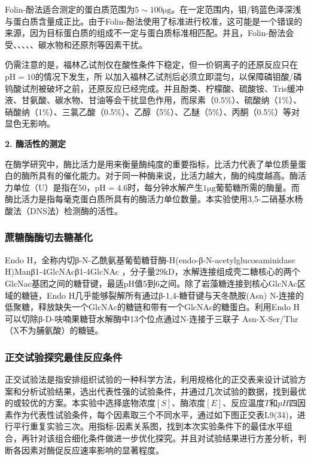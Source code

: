 Folin-酚法适合测定的蛋白质范围为$5\sim100 \mathrm{μg}$。在一定范围内，钼/钨蓝色泽深浅与蛋白质含量成正比。由于Folin-酚法使用了标准进行校准，这可能是一个错误的来源，因为目标蛋白质的组成不一定与蛋白质标准相匹配。并且，Folin-酚法会受、、、、、碳水物和还原剂等因素干扰。

仍需注意的是，福林乙试剂仅在酸性条件下稳定，但一价铜离子的还原反应只在$\mathrm{pH}=10$的情况下发生，所
以加入福林乙试剂后必须立即混匀，以保障磷钼酸/磷钨酸试剂被破坏之前，还原反应已经完成。并且酚类、柠檬酸、硫酸铵、Tris缓冲液、甘氨酸、碳水物、甘油等会干扰显色作用，而尿素（0.5\%）、硫酸纳（1\%）、硝酸纳（1\%）、三氯乙酸（0.5\%）、乙醇（5\%）、乙醚（5\%）、丙酮（0.5\%）等对显色无影响。

 \noindent \textbf {2. 酶活性的测定}
 
在酶学研究中，酶比活力是用来衡量酶纯度的重要指标，比活力代表了单位质量蛋白的酶所具有的催化能力。对于同一种酶来说，比活力越大，酶的纯度越高。酶活力单位（U）是指在50\dc，$\mathrm{pH}=4.6$时，每分钟水解产生$1\mathrm{μg}$葡萄糖所需的酶量。而酶比活力是指每毫克蛋白质所具有的酶活力单位数量。本实验使用3,5-二硝基水杨酸法（DNS法）检测酶的活性。

\subsubsection{蔗糖酶酶切去糖基化}
\par Endo H，全称内切β-N-乙酰氨基葡萄糖苷酶-H(endo-β-N-acetylglucosaminidase H)Manβ1-4GlcNAcβ1-4GlcNAc ，分子量29kD，水解连接组成壳二糖核心的两个GlcNac基团之间的糖苷键，最适pH值5到6之间。除了岩藻糖连接到核心GlcNAc区域的糖链，Endo H几乎能够裂解所有通过β-1,4-糖苷键与天冬酰胺(Asn) N-连接的低聚糖，释放缺失一个GlcNAc的糖链和带有一个GlcNAc的糖蛋白。利用Endo H可以切除β-D-呋喃果糖苷水解酶中13个位点通过N-连接于三联子 Asn-X-Ser/Thr（X不为脯氨酸）的糖链。 
\subsubsection{正交试验探究最佳反应条件}
\par 正交试验法是指安排组织试验的一种科学方法，利用规格化的正交表来设计试验方案和分析试验结果，选出代表性强的试验条件，并通过几次试验的数据，找到最优的或较优的方案。本实验中选择底物浓度$[S]$、酶浓度$[E]$、反应温度$T$和$pH$四因素作为代表性试验条件，每个因素取三个不同水平，通过如下图正交表L9(34)，进行平行重复实验三次。用指标-因素关系图，找到本次实验条件下的最佳水平组合，再针对该组合细化条件做进一步优化探究。并且对试验结果进行方差分析，判断各因素对酶促反应速率影响的显著程度。
